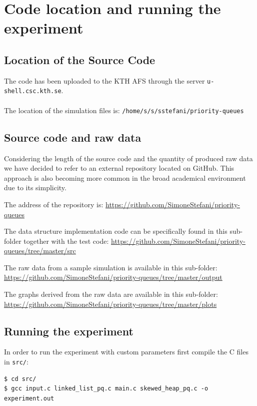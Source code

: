 \documentclass{article}
\begin{document}
\pagebreak



\section{Code location and running the experiment}

\subsection*{Location of the Source Code}
The code has been uploaded to the KTH AFS through the server \texttt{u-shell.csc.kth.se}.\\\\ The location of the simulation files is: \texttt{/home/s/s/sstefani/priority-queues}

\subsection*{Source code and raw data}
Considering the length of the source code and the quantity of produced raw data we have decided to refer to an external repository located on GitHub. This approach is also becoming more common in the broad academical environment due to its simplicity.

The address of the repository is: \url{https://github.com/SimoneStefani/priority-queues}

The data structure implementation code can be specifically found in this sub-folder together with the test code: \url{https://github.com/SimoneStefani/priority-queues/tree/master/src}

The raw data from a sample simulation is available in this sub-folder:
\url{https://github.com/SimoneStefani/priority-queues/tree/master/output}

The graphs derived from the raw data are available in this sub-folder:
\url{https://github.com/SimoneStefani/priority-queues/tree/master/plots}

\subsection*{Running the experiment}
In order to run the experiment with custom parameters first compile the C files in \texttt{src/}:

\begin{verbatim}
$ cd src/
$ gcc input.c linked_list_pq.c main.c skewed_heap_pq.c -o experiment.out   
\end{verbatim}
\end{document}
